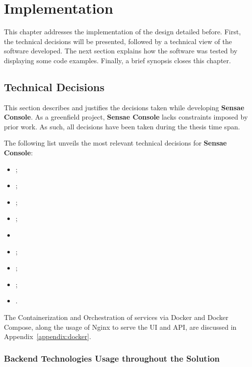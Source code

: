 \chapter{Implementation}
\label{chap:implementation}

This chapter addresses the implementation of the design detailed before. First, the technical decisions will be presented, followed by a technical view of the software developed. The next section explains how the software was tested by displaying some code examples. Finally, a brief synopsis closes this chapter.

\section{Technical Decisions}
\label{sec:implementation:decisions}

This section describes and justifies the decisions taken while developing \textbf{Sensae Console}.
As a greenfield project, \textbf{Sensae Console} lacks constraints imposed by prior work. As such, all decisions have been taken during the thesis time span.

The following list unveils the most relevant technical decisions for \textbf{Sensae Console}:

\begin{itemize}
    \item {};
    \item {};
    \item {};
    \item {};
    \item {}
    \item {};
    \item {};
    \item {};
    \item {}.
\end{itemize}

The Containerization and Orchestration of services via Docker and Docker Compose, along the usage of Nginx to serve the \gls{UI} and \gls{API}, are discussed in Appendix~\ref{appendix:docker}.

\subsection{Backend Technologies Usage throughout the Solution}
\label{subsec:implementation:decisions:backend}

